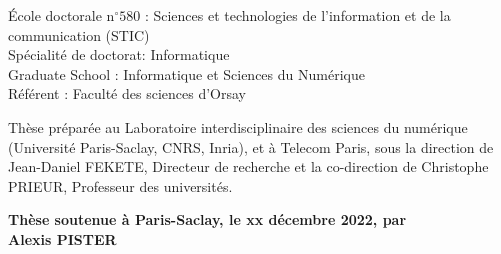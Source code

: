 \documentclass[12pt,a4paper, twoside]{book}
\begin{document}
\begin{titlepage}
        \vspace{6mm}

        \small École doctorale n$^{\circ}580$ : Sciences et technologies de l’information et de la communication (STIC)\\
        \small Spécialité de doctorat: Informatique\\
        \small Graduate School : Informatique et Sciences du Numérique\\
        \small Référent : Faculté des sciences d’Orsay \\
        \vspace{6mm}


        \footnotesize Thèse préparée au Laboratoire interdisciplinaire des sciences du numérique (Université Paris-Saclay, CNRS, Inria), et à Telecom Paris, sous la direction de Jean-Daniel FEKETE, Directeur de recherche et la co-direction de Christophe PRIEUR, Professeur des universités. \\

        \vspace{15mm}

        \textbf{Thèse soutenue à Paris-Saclay, le xx décembre 2022, par}\\
        \bigskip
        \Large {\color{Prune} \textbf{Alexis PISTER}} %

        \vspace{\fill} %

        \bigskip


\end{titlepage}
\end{document}

